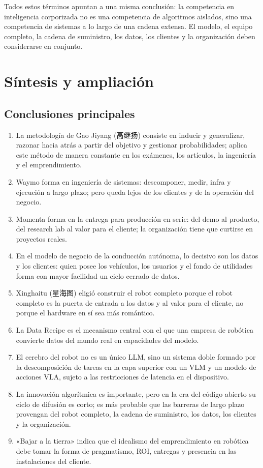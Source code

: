 \documentclass[a4paper]{article}
\begin{document}
Todos estos términos apuntan a una misma conclusión: la competencia en inteligencia corporizada no es una competencia de algoritmos aislados, sino una competencia de sistemas a lo largo de una cadena extensa. El modelo, el equipo completo, la cadena de suministro, los datos, los clientes y la organización deben considerarse en conjunto.
\section{Síntesis y ampliación}

\subsection{Conclusiones principales}

\begin{enumerate}
\item La metodología de Gao Jiyang (高继扬) consiste en inducir y generalizar, razonar hacia atrás a partir del objetivo y gestionar probabilidades; aplica este método de manera constante en los exámenes, los artículos, la ingeniería y el emprendimiento.
\item Waymo forma en ingeniería de sistemas: descomponer, medir, infra y ejecución a largo plazo; pero queda lejos de los clientes y de la operación del negocio.
\item Momenta forma en la entrega para producción en serie: del demo al producto, del research lab al valor para el cliente; la organización tiene que curtirse en proyectos reales.
\item En el modelo de negocio de la conducción autónoma, lo decisivo son los datos y los clientes: quien posee los vehículos, los usuarios y el fondo de utilidades forma con mayor facilidad un ciclo cerrado de datos.
\item Xinghaitu (星海图) eligió construir el robot completo porque el robot completo es la puerta de entrada a los datos y al valor para el cliente, no porque el hardware en sí sea más romántico.
\item La Data Recipe es el mecanismo central con el que una empresa de robótica convierte datos del mundo real en capacidades del modelo.
\item El cerebro del robot no es un único LLM, sino un sistema doble formado por la descomposición de tareas en la capa superior con un VLM y un modelo de acciones VLA, sujeto a las restricciones de latencia en el dispositivo.
\item La innovación algorítmica es importante, pero en la era del código abierto su ciclo de difusión es corto; es más probable que las barreras de largo plazo provengan del robot completo, la cadena de suministro, los datos, los clientes y la organización.
\item «Bajar a la tierra» indica que el idealismo del emprendimiento en robótica debe tomar la forma de pragmatismo, ROI, entregas y presencia en las instalaciones del cliente.
\end{enumerate}
\end{document}
